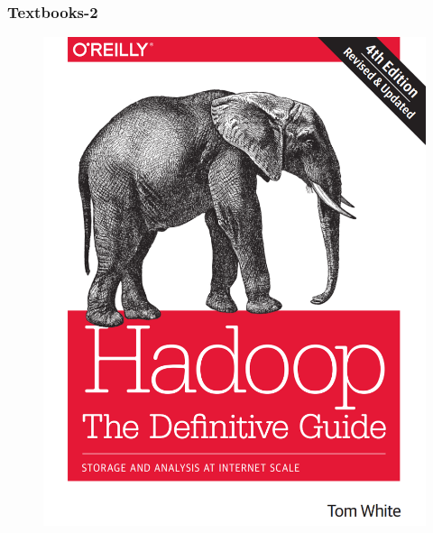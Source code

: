 \begin{frame}
\frametitle{Textbooks-2}

\begin{figure}[ht]
	\begin{minipage}[c][1\width]{
				0.4\textwidth}
			\centering
		\includegraphics[width=\linewidth]{./Figures/chapter-00/hadoop-tdg.png}
	\end{minipage}
	\hfill 	
	\begin{minipage}[c][1\width]{
				0.4\textwidth}
			\centering

\end{minipage}
\end{figure}
\end{frame}
